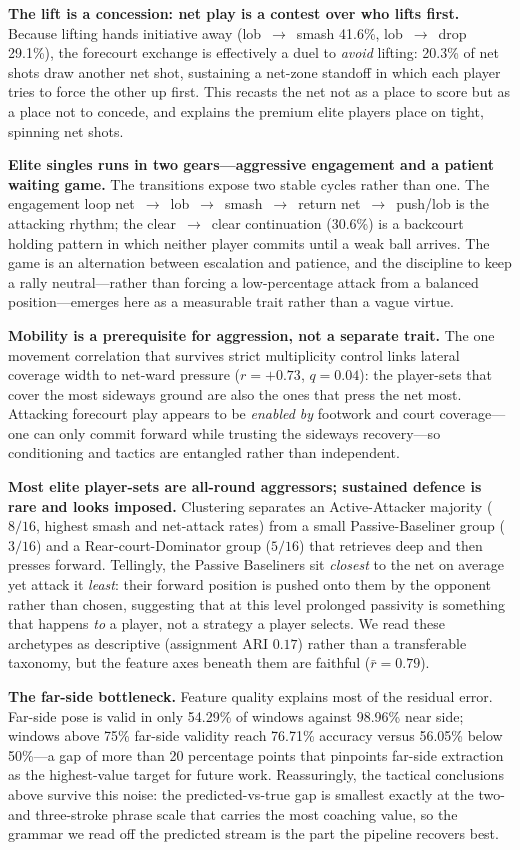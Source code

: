 \textbf{The lift is a concession: net play is a contest over who lifts first.}
Because lifting hands initiative away (lob~$\rightarrow$~smash 41.6\%,
lob~$\rightarrow$~drop 29.1\%), the forecourt exchange is effectively a duel to
\emph{avoid} lifting: 20.3\% of net shots draw another net shot, sustaining a
net-zone standoff in which each player tries to force the other up first. This
recasts the net not as a place to score but as a place not to concede, and
explains the premium elite players place on tight, spinning net shots.

\textbf{Elite singles runs in two gears---aggressive engagement and a patient
waiting game.} The transitions expose two stable cycles rather than one. The
engagement loop net~$\rightarrow$~lob~$\rightarrow$~smash~$\rightarrow$~return
net~$\rightarrow$~push/lob is the attacking rhythm; the clear~$\rightarrow$~clear
continuation (30.6\%) is a backcourt holding pattern in which neither player
commits until a weak ball arrives. The game is an alternation between escalation
and patience, and the discipline to keep a rally neutral---rather than forcing a
low-percentage attack from a balanced position---emerges here as a measurable
trait rather than a vague virtue.

\textbf{Mobility is a prerequisite for aggression, not a separate trait.}
The one movement correlation that survives strict multiplicity control links
lateral coverage width to net-ward pressure ($r=+0.73$, $q=0.04$): the
player-sets that cover the most sideways ground are also the ones that press the
net most. Attacking forecourt play appears to be \emph{enabled by} footwork and
court coverage---one can only commit forward while trusting the sideways
recovery---so conditioning and tactics are entangled rather than independent.

\textbf{Most elite player-sets are all-round aggressors; sustained defence is
rare and looks imposed.} Clustering separates an Active-Attacker majority
($8/16$, highest smash and net-attack rates) from a small Passive-Baseliner
group ($3/16$) and a Rear-court-Dominator group ($5/16$) that retrieves deep and
then presses forward. Tellingly, the Passive Baseliners sit \emph{closest} to
the net on average yet attack it \emph{least}: their forward position is pushed
onto them by the opponent rather than chosen, suggesting that at this level
prolonged passivity is something that happens \emph{to} a player, not a strategy
a player selects. We read these archetypes as descriptive (assignment ARI
$0.17$) rather than a transferable taxonomy, but the feature axes beneath them
are faithful ($\bar{r}=0.79$).

\textbf{The far-side bottleneck.}
Feature quality explains most of the residual error. Far-side pose is valid in
only 54.29\% of windows against 98.96\% near side; windows above 75\% far-side
validity reach 76.71\% accuracy versus 56.05\% below 50\%---a gap of more than 20
percentage points that pinpoints far-side extraction as the highest-value target
for future work. Reassuringly, the tactical conclusions above survive this
noise: the predicted-vs-true gap is smallest exactly at the two- and
three-stroke phrase scale that carries the most coaching value, so the grammar
we read off the predicted stream is the part the pipeline recovers best.
